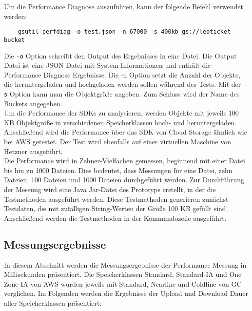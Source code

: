 Um die Performance Diagnose auszuführen, kann der folgende Befehl verwendet werden:

\begin{lstlisting}
	gsutil perfdiag -o test.json -n 67000 -s 400kb gs://leoticket-bucket
\end{lstlisting}

Die \verb|-o| Option schreibt den Output des Ergebnisses in eine Datei. Die Output Datei ist eine JSON Datei mit System Informationen und enthält die Performance Diagnose Ergebnisse. Die -n Option setzt die Anzahl der Objekte, die heruntergeladen und hochgeladen werden sollen während des Tests. Mit der \verb|-s| Option kann man die Objektgröße angeben. Zum Schluss wird der Name des Buckets angegeben.\\

Um die Performance der SDKs zu analysieren, werden Objekte mit jeweils 100 KB Objektgröße in verschiedenen Speicherklassen hoch- und heruntergeladen. Anschließend wird die Performance über das SDK von Cloud Storage ähnlich wie bei AWS getestet. Der Test wird ebenfalls auf einer virtuellen Maschine von Hetzner ausgeführt.\\

Die Performance wird in Zehner-Vielfachen gemessen, beginnend mit einer Datei bis hin zu 1000 Dateien. Dies bedeutet, dass Messungen für eine Datei, zehn Dateien, 100 Dateien und 1000 Dateien durchgeführt werden. Zur Durchführung der Messung wird eine Java Jar-Datei des Prototyps erstellt, in der die Testmethoden ausgeführt werden. Diese Testmethoden generieren zunächst Testdaten, die mit zufälligen String-Werten der Größe 100 KB gefüllt sind. Anschließend werden die Testmethoden in der Kommandozeile ausgeführt.

\newpage

\subsection{Messungsergebnisse}

In diesem Abschnitt werden die Messungsergebnisse der Performance Messung in Millisekunden präsentiert. Die Speicherklassen Standard, Standard-IA und One Zone-IA von AWS wurden jeweils mit Standard, Nearline und Coldline von GC verglichen. Im Folgenden werden die Ergebnisse der Upload und Download Dauer aller Speicherklassen präsentiert: 

